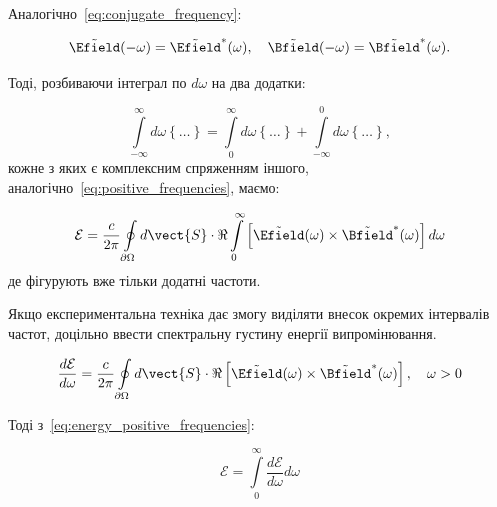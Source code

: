 Аналогічно~\eqref{eq:conjugate_frequency}:

\begin{equation*}
	\tilde{\Efield}(-\omega) = \tilde{\Efield}^{*}(\omega), \quad \tilde{\Bfield}(-\omega) = \tilde{\Bfield}^{*}(\omega).
\end{equation*}

Тоді, розбиваючи інтеграл по \( d\omega \) на два додатки:

\begin{equation*}
	\int\limits_{-\infty}^{\infty} d\omega \left\{ \ldots \right\} = \int\limits_{0}^{\infty} d\omega \left\{ \ldots \right\} +
	\int\limits_{-\infty}^{0}
	d\omega
	\left\{ \ldots \right\},
\end{equation*}
кожне з яких є комплексним спряженням іншого, аналогічно~\eqref{eq:positive_frequencies}, маємо:

\begin{equation}
	\mathcal{E} = \frac{c}{2\pi} \oint\limits_{\partial\Omega} d\vect{S} \cdot  \Re\int\limits_{0}^{\infty} \left[\tilde{\Efield}(\omega) \times \tilde{\Bfield}^{*}(\omega) \right] d\omega
	\label{eq:energy_positive_frequencies}
\end{equation}
де фігурують вже тільки додатні частоти.

Якщо експериментальна техніка дає змогу виділяти внесок окремих інтервалів частот, доцільно ввести спектральну густину
енергії випромінювання.

\begin{equation*}
	\frac{d\mathcal{E}}{d\omega} = \frac{c}{2\pi} \oint\limits_{\partial\Omega} d\vect{S} \cdot \Re\left[ \tilde{\Efield}(\omega) \times \tilde{\Bfield}^{*}(\omega)\right], \quad \omega > 0
\end{equation*}

Тоді з~\eqref{eq:energy_positive_frequencies}:

\begin{equation*}
	\mathcal{E} = \int\limits_0^{\infty} \frac{d\mathcal{E}}{d\omega} d\omega
\end{equation*}

